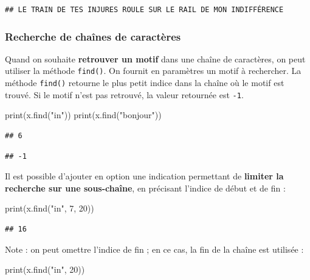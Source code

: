 \documentclass[12pt,]{book}
\newenvironment{Shaded}{\begin{snugshade}}{\end{snugshade}}
\newcommand{\DecValTok}[1]{\textcolor[rgb]{0.00,0.00,0.81}{#1}}
\newcommand{\StringTok}[1]{\textcolor[rgb]{0.31,0.60,0.02}{#1}}
\newcommand{\BuiltInTok}[1]{#1}
\newcommand{\NormalTok}[1]{#1}
\numberwithin{equation}{section}
\numberwithin{countremarque}{section}
\begin{document}
\begin{lstlisting}
## LE TRAIN DE TES INJURES ROULE SUR LE RAIL DE MON INDIFFÉRENCE
\end{lstlisting}

\subsubsection{Recherche de chaînes de
caractères}\label{recherche-de-chaines-de-caracteres}

Quand on souhaite \textbf{retrouver un motif} dans une chaîne de
caractères, on peut utiliser la méthode \texttt{find()}. On fournit en
paramètres un motif à rechercher. La méthode \texttt{find()} retourne le
plus petit indice dans la chaîne où le motif est trouvé. Si le motif
n'est pas retrouvé, la valeur retournée est \texttt{-1}.

\begin{Shaded}
\begin{Highlighting}[]
\BuiltInTok{print}\NormalTok{(x.find(}\StringTok{"in"}\NormalTok{))}
\BuiltInTok{print}\NormalTok{(x.find(}\StringTok{"bonjour"}\NormalTok{))}
\end{Highlighting}
\end{Shaded}

\begin{lstlisting}
## 6
\end{lstlisting}

\begin{lstlisting}
## -1
\end{lstlisting}

Il est possible d'ajouter en option une indication permettant de
\textbf{limiter la recherche sur une sous-chaîne}, en précisant l'indice
de début et de fin :

\begin{Shaded}
\begin{Highlighting}[]
\BuiltInTok{print}\NormalTok{(x.find(}\StringTok{"in"}\NormalTok{, }\DecValTok{7}\NormalTok{, }\DecValTok{20}\NormalTok{))}
\end{Highlighting}
\end{Shaded}

\begin{lstlisting}
## 16
\end{lstlisting}

Note : on peut omettre l'indice de fin ; en ce cas, la fin de la chaîne
est utilisée :

\begin{Shaded}
\begin{Highlighting}[]
\BuiltInTok{print}\NormalTok{(x.find(}\StringTok{"in"}\NormalTok{, }\DecValTok{20}\NormalTok{))}
\end{Highlighting}
\end{Shaded}
\end{document}
